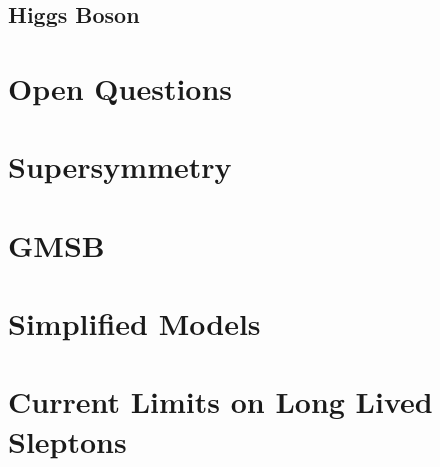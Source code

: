 \subsection{Higgs Boson}


\section{Open Questions}
\section{Supersymmetry}

\section{GMSB}

\section{Simplified Models}

\section{Current Limits on Long Lived Sleptons}



